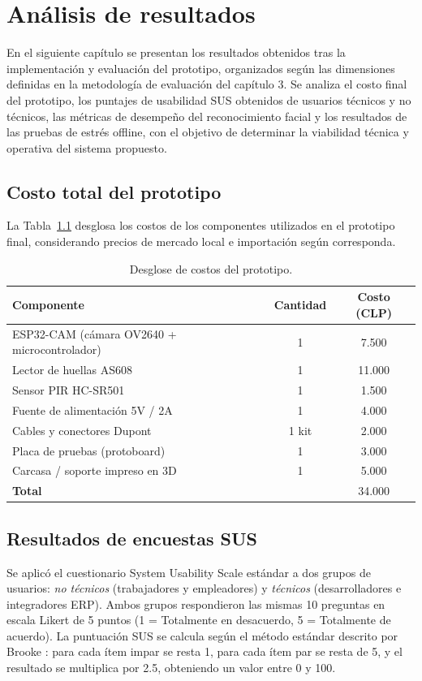 \documentclass{iccmemoria}
\begin{document}
\chapter{Análisis de resultados}

En el siguiente capítulo se presentan los resultados obtenidos tras la implementación y evaluación del prototipo, organizados según las dimensiones definidas en la metodología de evaluación del capítulo 3. Se analiza el costo final del prototipo, los puntajes de usabilidad SUS obtenidos de usuarios técnicos y no técnicos, las métricas de desempeño del reconocimiento facial y los resultados de las pruebas de estrés offline, con el objetivo de determinar la viabilidad técnica y operativa del sistema propuesto.

\section{Costo total del prototipo}
La Tabla~\ref{tab:costos} desglosa los costos de los componentes utilizados en el prototipo final, considerando precios de mercado local e importación según corresponda.

\begin{table}[H]
\centering
\begin{tabular}{|l|c|c|}
\hline
\textbf{Componente} & \textbf{Cantidad} & \textbf{Costo (CLP)} \\
\hline
ESP32-CAM (cámara OV2640 + microcontrolador) & 1 & 7.500 \\
Lector de huellas AS608 & 1 & 11.000 \\
Sensor PIR HC-SR501 & 1 & 1.500 \\
Fuente de alimentación 5V / 2A & 1 & 4.000 \\
Cables y conectores Dupont & 1 kit & 2.000 \\
Placa de pruebas (protoboard) & 1 & 3.000 \\
Carcasa / soporte impreso en 3D & 1 & 5.000 \\
\hline
\textbf{Total} & & 34.000 \\
\hline
\end{tabular}
\caption{Desglose de costos del prototipo.}
\label{tab:costos}
\end{table}

\section{Resultados de encuestas SUS}
\label{sec:resultados_sus}
Se aplicó el cuestionario System Usability Scale estándar a dos grupos de usuarios: \textit{no técnicos} (trabajadores y empleadores) y \textit{técnicos} (desarrolladores e integradores ERP). Ambos grupos respondieron las mismas 10 preguntas en escala Likert de 5 puntos (1 = Totalmente en desacuerdo, 5 = Totalmente de acuerdo). La puntuación SUS se calcula según el método estándar descrito por Brooke \cite{brooke1996}: para cada ítem impar se resta 1, para cada ítem par se resta de 5, y el resultado se multiplica por 2.5, obteniendo un valor entre 0 y 100.
\end{document}
